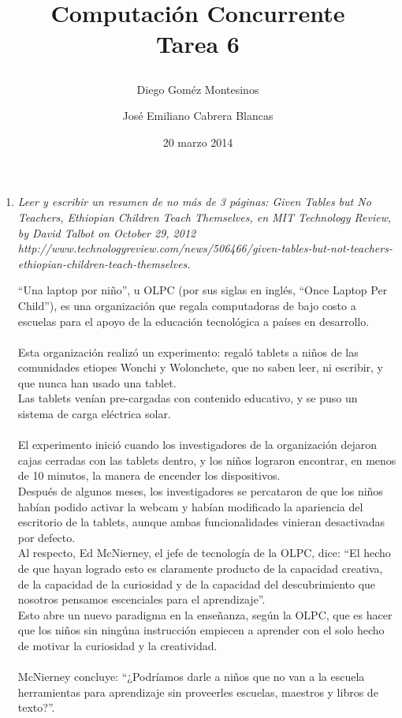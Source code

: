 \documentclass{article}
\title{ Computación Concurrente \\ \Large{Tarea 6}
\author{
  Diego Goméz Montesinos
  \and
  José Emiliano Cabrera Blancas
  }
\date{20 marzo 2014}
}
\begin{document}
\maketitle
\begin{enumerate}
  
  \item{
    \textsl{
      Leer y escribir un resumen de no más de 3 páginas: Given Tables
      but No Teachers, Ethiopian Children Teach Themselves, en MIT
      Technology Review, by David Talbot on October 29, 2012\\
      http://www.technologyreview.com/news/506466/given-tables-but-not-teachers-ethiopian-children-teach-themselves.\\
    } 

    ``Una laptop por niño'', u OLPC (por sus siglas en inglés, ``Once
    Laptop Per Child''),  es una organización que regala
    computadoras de bajo costo a escuelas para el apoyo de la
    educación  tecnológica a países en desarrollo.\\\\
    Esta organización realizó un experimento: regaló tablets a niños
    de las comunidades etiopes Wonchi y Wolonchete, que no saben leer,
    ni escribir, y que nunca han usado una tablet.\\
    Las tablets venían pre-cargadas con contenido educativo, y se puso
    un sistema de carga eléctrica solar.\\\\
    El experimento inició cuando los investigadores de la organización
    dejaron cajas cerradas con las tablets dentro,
    y los niños lograron encontrar, en menos de 10 minutos, la manera
    de encender los dispositivos.\\
    Después de algunos meses, los investigadores se percataron de que
    los niños  habían podido activar la webcam
    y habían modificado la apariencia del escritorio de la tablets,
    aunque ambas funcionalidades vinieran
    desactivadas por defecto.\\
    Al respecto, Ed McNierney, el jefe de tecnología de la OLPC, dice:
    ``El hecho de que hayan logrado esto
    es claramente producto de la capacidad creativa, de la capacidad
    de la curiosidad  y de la capacidad del
    descubrimiento que nosotros pensamos escenciales para el aprendizaje''.\\
    Esto abre un nuevo paradigma en la enseñanza, según la OLPC, que
    es hacer que los niños sin ningúna instrucción
    empiecen a aprender con el solo hecho de motivar la curiosidad y
    la creatividad.\\\\
    McNierney concluye: ``¿Podríamos darle a niños que no van a la
    escuela herramientas para aprendizaje sin
    proveerles escuelas, maestros y libros de texto?''.\\\\
  }
  

\end{enumerate}
\end{document}
